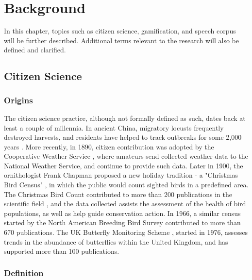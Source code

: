 \chapter{Background}
\label{chap:background}

In this chapter, topics such as citizen science, gamification, and speech corpus will be further described. Additional terms relevant to the research will also be defined and clarified. 

\section{Citizen Science}

\subsection{Origins}

The citizen science practice, although not formally defined as such, dates back at least a couple of millennia. In ancient China, migratory locusts frequently destroyed harvests, and residents have helped to track outbreaks for some 2,000 years \cite{irwin2018no}. More recently, in 1890, citizen contribution was adopted by the Cooperative Weather Service \cite{quayle1991effects}, where amateurs send collected weather data to the National Weather Service, and continue to provide such data. Later in 1900, the ornithologist Frank Chapman proposed a new holiday tradition - a "Christmas Bird Census" \cite{harden1985christmas}, in which the public would count sighted birds in a predefined area. The Christmas Bird Count contributed to more than 200 publications in the scientific field \cite{kosmala2016assessing}, and the data collected assists the assessment of the health of bird populations, as well as help guide conservation action. In 1966, a similar census started by the North American Breeding Bird Survey contributed to more than 670 publications. The UK Butterfly Monitoring Scheme \cite{pollard1994monitoring}, started in 1976, assesses trends in the abundance of butterflies within the United Kingdom, and has supported more than 100 publications.

\subsection{Definition}

